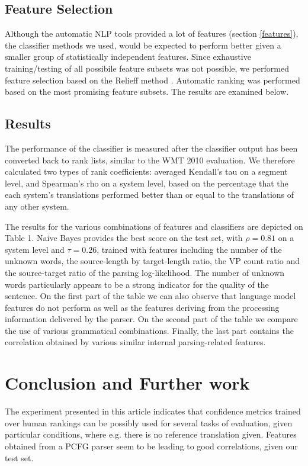 \documentclass[11pt]{article}
\begin{document}
\subsection{Feature Selection}
Although the automatic NLP tools provided a
lot of features (section \ref{features}), the classifier methods we used, would
be expected to perform better given a smaller group of statistically independent
features. Since exhaustive training/testing of all possibile feature subsets 
was not possible, we performed feature selection based on the Relieff method
\cite{Kononenko94estimatingattributes:,kira1992feature}. Automatic ranking was
performed based on the most promising feature subsets. The results are examined below.

\subsection{Results}
The performance of the classifier is measured after the classifier
output has been converted back to rank lists, similar to the WMT 2010
evaluation. We therefore calculated two types of rank coefficients: averaged
Kendall's tau on a segment level, and Spearman's rho on a system level, based
on the percentage that the each system's translations performed better than or equal to the translations
of any other system.

The results for the various combinations of features and classifiers are
depicted on Table 1. Naive Bayes provides the best score on the test set, with
$\rho = 0.81$ on a system level and $\tau = 0.26$, trained with features
including the number of the unknown words, the source-length by target-length
ratio, the VP count ratio and the source-target ratio of the parsing
log-likelihood. The number of unknown words particularly appears to be a strong indicator for the quality of
the sentence. On the first part of the table we can also observe that language
model features do not perform as well as the features deriving from the
processing information delivered by the parser. On the second part of the table
we compare the use of various grammatical combinations. Finally, the last part
contains the correlation obtained by various similar internal parsing-related features.

\section {Conclusion and Further work}
The experiment presented in this article indicates that confidence metrics
trained over human rankings can be possibly used for several tasks of
evaluation, given particular conditions, where e.g. there is no reference
translation given. Features obtained from a PCFG parser seem to be
leading to good correlations, given our test set. 
\end{document}
